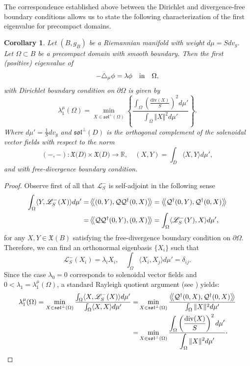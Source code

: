 \documentclass{amsart}
\newtheorem{corollary}[theorem]{Corollary}
\theoremstyle{definition}
\theoremstyle{remark}
\numberwithin{equation}{section}
\newcommand{\diver}{{{\mathrm{div}}}}
\begin{document}
The correspondence established above between the Dirichlet and divergence-free boundary conditions allows us to state the following characterization of the first eigenvalue for precompact domains.

\begin{corollary}\label{ElCorollari}
 Let $(B,g_B)$ be a Riemannian manifold with weight $d\mu= Sdv_g$. Let $\Omega \subset B$ be a precompact domain with smooth boundary. Then the first (positive) eigenvalue of 
 $$
-\triangle_\mu \phi=\lambda \phi\quad {\rm in}\quad \Omega,
 $$
 with Dirichlet boundary condition on $\partial \Omega$ is given by
 $$
\lambda_1^\mu(\Omega)=\min_{X\in\mathfrak{sol}^\perp(\Omega)} \left\{\frac{\displaystyle \int_\Omega \left(\frac{\diver(X)}{S}\right)^2d\mu'}{\displaystyle\int_\Omega \Vert X\Vert^2d\mu'}\right\}.
 $$
 Where $d\mu'=\frac{1}{S}dv_g$ and $\mathfrak{sol}^\perp(D)$ is the orthogonal complement of the solenoidal vector fields with respect to the norm
$$
(-,-):\mathfrak{X(}D)\times\mathfrak{X(}D)\to \mathbb{R}, \quad (X,Y)=\int_D\langle X,Y\rangle d\mu', 
$$
and with free-divergence boundary condition.
\end{corollary}
\begin{proof}
    Observe first of all that $\mathscr{L}_S^-$ is self-adjoint in the following sense
    $$
    \begin{aligned}
\int_\Omega\langle Y,\mathscr{L}_S^-(X)\rangle d\mu'= &\left\langle\mkern-4mu\left\langle (0,Y), \mathcal{Q}\mathcal{Q}^\dag(0,X) \right\rangle\mkern-4mu\right\rangle=\left\langle\mkern-4mu\left\langle \mathcal{Q}^\dag(0,Y), \mathcal{Q}^\dag(0,X) \right\rangle\mkern-4mu\right\rangle\\
=&\left\langle\mkern-4mu\left\langle \mathcal{Q}\mathcal{Q}^\dag(0,Y), (0,X) \right\rangle\mkern-4mu\right\rangle=\int_\Omega\langle \mathscr{L}_S^-(Y),X\rangle d\mu',
    \end{aligned}
    $$
    for any $X,Y\in \mathfrak{X}(B)$ satisfying the free-divergence boundary condition on $\partial \Omega$. Therefore, we can find an orthonormal eigenbasis $\{X_i\}$ such that
    $$
\mathscr{L}_S^-(X_i)=\lambda_iX_i,\quad \int_\Omega\langle X_i,X_j\rangle d\mu'=\delta_{ij} .
    $$
    Since the case $\lambda_0=0$ corresponds to solenoidal vector fields and $0<\lambda_1=\lambda_1^{\mu}(\Omega)$, a standard Rayleigh quotient argument (see \cite{Chavel}) yields:
    $$
    \begin{aligned}
\lambda_1^{\mu}(\Omega)=\min_{X \in \mathfrak{sol}^\perp(\Omega)} \frac{\int_\Omega\langle X,\mathscr{L}_S^-(X)\rangle d\mu'}{\int_\Omega\langle X,X\rangle d\mu'}=&\min_{X \in \mathfrak{sol}^\perp(\Omega)}\frac{\left\langle\mkern-4mu\left\langle \mathcal{Q}^\dag(0,X), \mathcal{Q}^\dag(0,X) \right\rangle\mkern-4mu\right\rangle}{\int_\Omega\Vert X\Vert^2 d\mu'}\\
=&\min_{X \in \mathfrak{sol}^\perp(\Omega)} \frac{\displaystyle \int_\Omega \left(\frac{\diver(X)}{S}\right)^2d\mu'}{\displaystyle\int_\Omega \Vert X\Vert^2d\mu'}\cdot        
    \end{aligned}
$$
\end{proof}
\end{document}
